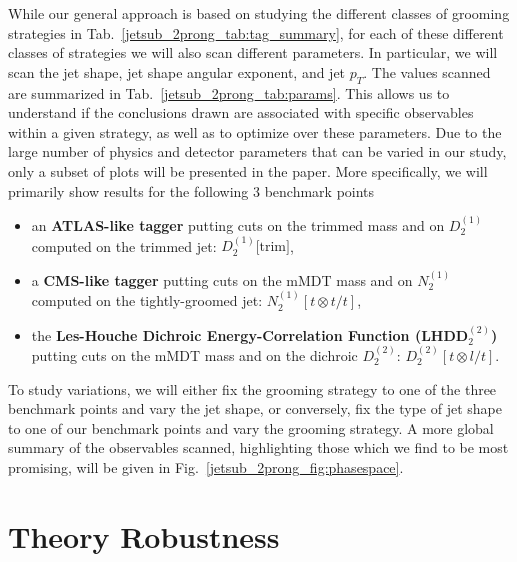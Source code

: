 \documentclass[11pt]{cernrep}
\begin{document}
While our general approach is based on studying the different classes of grooming strategies in Tab.~\ref{jetsub_2prong_tab:tag_summary}, for each of these different classes of strategies we will also scan different parameters.
%
In particular, we will scan the jet shape, jet shape angular exponent, and jet $p_T$.
%
The values scanned are summarized in Tab.~\ref{jetsub_2prong_tab:params}.
%
This allows us to understand if the conclusions drawn are associated with specific observables within a given strategy, as well as to optimize over these parameters.
%
Due to the large number of physics and detector parameters that can be
varied in our study, only a subset of plots will be presented in the
paper. More specifically, we will primarily show results for the
following 3 benchmark points
%
\begin{itemize}
%
\item an {\bf ATLAS-like tagger} putting cuts on the trimmed mass and
on $D_2^{(1)}$ computed on the trimmed jet: $D_2^{(1)}\text{[trim]}$,
%
\item a {\bf CMS-like tagger} putting cuts on the mMDT mass and on
$N_2^{(1)}$ computed on the tightly-groomed jet: $N_2^{(1)}[t\otimes t/t]$,
%
\item the {\bf Les-Houche Dichroic Energy-Correlation Function
(LHDD$_2^{(2)}$)} putting cuts on the mMDT mass and on the dichroic
$D_2^{(2)}$: $D_2^{(2)}[t\otimes l/t]$.
%
\end{itemize}
%
To study variations, we will either fix the grooming strategy to one
of the three benchmark points and vary the jet shape, or conversely,
fix the type of jet shape to one of our benchmark points and vary the
grooming strategy.
%
A more global summary of the observables scanned, highlighting those
which we find to be most promising, will be given in
Fig.~\ref{jetsub_2prong_fig:phasespace}.


%






\section{Theory Robustness}\label{jetsub_2prong_sec:np}
\end{document}
